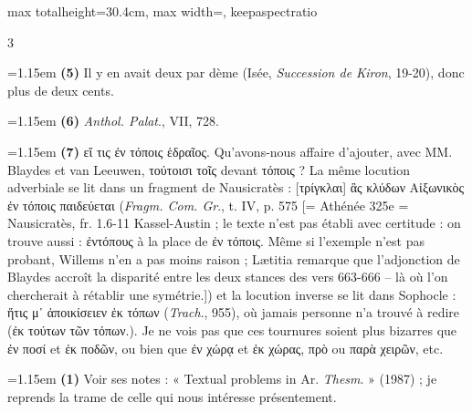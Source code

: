 \documentclass[11pt,twoside]{book}
\newcommand{\currHeadLE}{}
\newcommand{\currHeadRE}{}
\newcommand{\currHeadLO}{}
\newcommand{\currHeadRO}{}
\newcommand{\italique}[1]{\textit{#1}}
\newcommand{\R}{\textbf{R}}
\begin{document}
\begin{adjustbox}{max totalheight=30.4cm, max width=\textwidth, keepaspectratio}
\begin{minipage}{\textwidth}
{\begin{multicols}{3}
\par\vspace{1.5pt}
\noindent\hangindent=1.15em {\color{sepiaNote}\textbf{(5)}} Il y en avait deux par dème (Isée, \italique{Succession de Kiron}, 19-20), donc plus de deux cents.
\par\vspace{1.5pt}
\noindent\hangindent=1.15em {\color{sepiaNote}\textbf{(6)}} \italique{Anthol. Palat}., VII, 728.
\par\vspace{1.5pt}
\noindent\hangindent=1.15em {\color{sepiaNote}\textbf{(7)}} εἴ τις ἐν τόποις ἑδραῖος. Qu'avons-nous affaire d'ajouter, avec MM. Blaydes et van Leeuwen, τούτοισι τοῖς devant τόποις ? La même locution adverbiale se lit dans un fragment de Nausicratès : [τρίγκλαι] ἃς κλύδων Αἰξωνικὸς ἐν τόποις παιδεύεται (\italique{Fragm. Com. Gr}., t. IV, p. 575 [= Athénée 325e = Nausicratès, fr. 1.6-11 Kassel-Austin ; le texte n'est pas établi avec certitude : on trouve aussi : ἐντόπους à la place de ἐν τόποις. Même si l'exemple n'est pas probant, Willems n'en a pas moins raison ; Lætitia remarque que l'adjonction de Blaydes accroît la disparité entre les deux stances des vers 663-666 -- là où l'on chercherait à rétablir une symétrie.]) et la locution inverse se lit dans Sophocle : ἥτις μ᾽ ἀποικίσειεν ἐκ τόπων (\italique{Trach}., 955), où jamais personne n'a trouvé à redire (ἐκ τούτων τῶν τόπων.). Je ne vois pas que ces tournures soient plus bizarres que ἐν ποσί et ἐκ ποδῶν, ou bien que ἐν χώρᾳ et ἐκ χώρας, πρὸ ou παρὰ χειρῶν, etc.
\par\vspace{1.5pt}
\noindent\hangindent=1.15em {\color{sepiaNote}\textbf{(1)}} Voir ses notes : « Textual problems in Ar. \italique{Thesm}. » (1987) ; je reprends la trame de celle qui nous intéresse présentement.
\par\end{multicols}}
\end{minipage}\end{adjustbox}
\clearpage\ifodd\value{page}\hbox{}\newpage\fi
\renewcommand{\currHeadLE}{ΑΡΙΣΤΟΦΑΝΟΥΣ ΘΕΣΜΟΦΟΡΙΑΖΟΥΣΑΙ · CODEX RAVENNAS 429 (\R)}
\renewcommand{\currHeadRE}{Folio f. 170v (Classense 172v) · vv. 679–720}
\renewcommand{\currHeadLO}{FAC-SIMILÉ DU CODEX RAVENNAS 429 (\R) · f. 170v (Classense 172v)}
\renewcommand{\currHeadRO}{vv. 679–720 · Planche recadrée sur la zone écrite et harmonisée}
\end{document}
